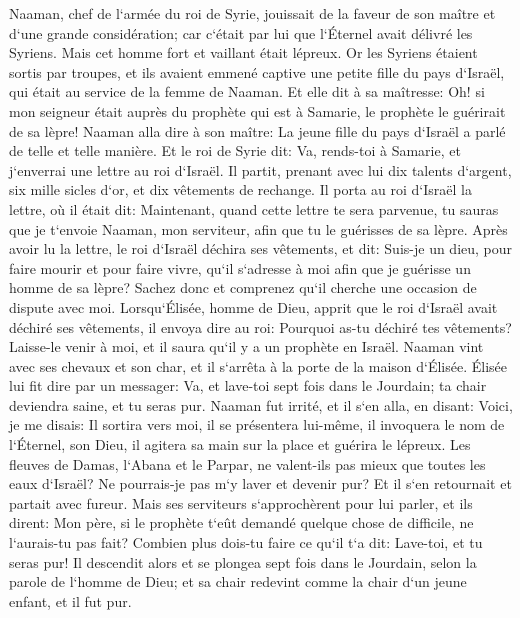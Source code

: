 \verse Naaman, chef de l`armée du roi de Syrie, jouissait de la faveur de son maître et d`une grande considération; car c`était par lui que l`Éternel avait délivré les Syriens. Mais cet homme fort et vaillant était lépreux. 
\verse Or les Syriens étaient sortis par troupes, et ils avaient emmené captive une petite fille du pays d`Israël, qui était au service de la femme de Naaman. 
\verse Et elle dit à sa maîtresse: Oh! si mon seigneur était auprès du prophète qui est à Samarie, le prophète le guérirait de sa lèpre! 
\verse Naaman alla dire à son maître: La jeune fille du pays d`Israël a parlé de telle et telle manière. 
\verse Et le roi de Syrie dit: Va, rends-toi à Samarie, et j`enverrai une lettre au roi d`Israël. Il partit, prenant avec lui dix talents d`argent, six mille sicles d`or, et dix vêtements de rechange. 
\verse Il porta au roi d`Israël la lettre, où il était dit: Maintenant, quand cette lettre te sera parvenue, tu sauras que je t`envoie Naaman, mon serviteur, afin que tu le guérisses de sa lèpre. 
\verse Après avoir lu la lettre, le roi d`Israël déchira ses vêtements, et dit: Suis-je un dieu, pour faire mourir et pour faire vivre, qu`il s`adresse à moi afin que je guérisse un homme de sa lèpre? Sachez donc et comprenez qu`il cherche une occasion de dispute avec moi. 
\verse Lorsqu`Élisée, homme de Dieu, apprit que le roi d`Israël avait déchiré ses vêtements, il envoya dire au roi: Pourquoi as-tu déchiré tes vêtements? Laisse-le venir à moi, et il saura qu`il y a un prophète en Israël. 
\verse Naaman vint avec ses chevaux et son char, et il s`arrêta à la porte de la maison d`Élisée. 
\verse Élisée lui fit dire par un messager: Va, et lave-toi sept fois dans le Jourdain; ta chair deviendra saine, et tu seras pur. 
\verse Naaman fut irrité, et il s`en alla, en disant: Voici, je me disais: Il sortira vers moi, il se présentera lui-même, il invoquera le nom de l`Éternel, son Dieu, il agitera sa main sur la place et guérira le lépreux. 
\verse Les fleuves de Damas, l`Abana et le Parpar, ne valent-ils pas mieux que toutes les eaux d`Israël? Ne pourrais-je pas m`y laver et devenir pur? Et il s`en retournait et partait avec fureur. 
\verse Mais ses serviteurs s`approchèrent pour lui parler, et ils dirent: Mon père, si le prophète t`eût demandé quelque chose de difficile, ne l`aurais-tu pas fait? Combien plus dois-tu faire ce qu`il t`a dit: Lave-toi, et tu seras pur! 
\verse Il descendit alors et se plongea sept fois dans le Jourdain, selon la parole de l`homme de Dieu; et sa chair redevint comme la chair d`un jeune enfant, et il fut pur. 
